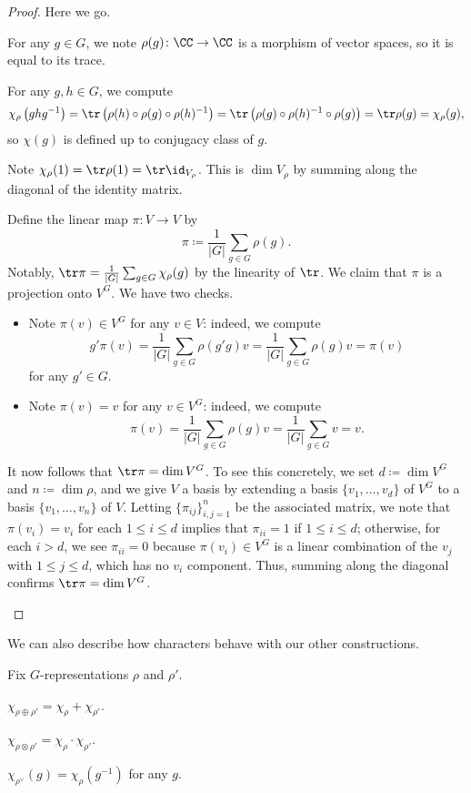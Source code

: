 \documentclass[../main.tex]{subfiles}
\begin{document}
\begin{proof}
	Here we go.
	\begin{listalph}
		\item For any $g\in G$, we note $\rho(g)\colon\CC\to\CC$ is a morphism of vector spaces, so it is equal to its trace.
		\item For any $g,h\in G$, we compute
		\[\chi_\rho\left(ghg^{-1}\right)=\tr\left(\rho(h)\circ\rho(g)\circ\rho(h)^{-1}\right)=\tr\left(\rho(g)\circ\rho(h)^{-1}\circ\rho(g)\right)=\tr\rho(g)=\chi_\rho(g),\]
		so $\chi(g)$ is defined up to conjugacy class of $g$.
		\item Note $\chi_\rho(1)=\tr\rho(1)=\tr\id_{V_\rho}$. This is $\dim V_\rho$ by summing along the diagonal of the identity matrix.
		\item Define the linear map $\pi\colon V\to V$ by
		\[\pi\coloneqq\frac1{|G|}\sum_{g\in G}\rho(g).\]
		Notably, $\tr\pi=\frac1{|G|}\sum_{g\in G}\chi_\rho(g)$ by the linearity of $\tr$. We claim that $\pi$ is a projection onto $V^G$. We have two checks.
		\begin{itemize}
			\item Note $\pi(v)\in V^G$ for any $v\in V$: indeed, we compute
			\[g'\pi(v)=\frac1{|G|}\sum_{g\in G}\rho(g'g)v=\frac1{|G|}\sum_{g\in G}\rho(g)v=\pi(v)\]
			for any $g'\in G$.
			\item Note $\pi(v)=v$ for any $v\in V^G$: indeed, we compute
			\[\pi(v)=\frac1{|G|}\sum_{g\in G}\rho(g)v=\frac1{|G|}\sum_{g\in G}v=v.\]
		\end{itemize}
		It now follows that $\tr\pi=\dim V^G$. To see this concretely, we set $d\coloneqq\dim V^G$ and $n\coloneqq\dim\rho$, and we give $V$ a basis by extending a basis $\{v_1,\ldots,v_d\}$ of $V^G$ to a basis $\{v_1,\ldots,v_n\}$ of $V$. Letting $\{\pi_{ij}\}_{i,j=1}^n$ be the associated matrix, we note that $\pi(v_i)=v_i$ for each $1\le i\le d$ implies that $\pi_{ii}=1$ if $1\le i\le d$; otherwise, for each $i>d$, we see $\pi_{ii}=0$ because $\pi(v_i)\in V^G$ is a linear combination of the $v_j$ with $1\le j\le d$, which has no $v_i$ component. Thus, summing along the diagonal confirms $\tr\pi=\dim V^G$.
		\qedhere
	\end{listalph}
\end{proof}
We can also describe how characters behave with our other constructions.
\begin{lemma} \label{lem:build-chars}
	Fix $G$-representations $\rho$ and $\rho'$.
	\begin{listalph}
		\item $\chi_{\rho\oplus\rho'}=\chi_\rho+\chi_{\rho'}$.
		\item $\chi_{\rho\otimes\rho'}=\chi_{\rho}\cdot\chi_{\rho'}$.
		\item $\chi_{\rho^\lor}(g)=\chi_\rho\left(g^{-1}\right)$ for any $g$.
	\end{listalph}
\end{lemma}
\end{document}

